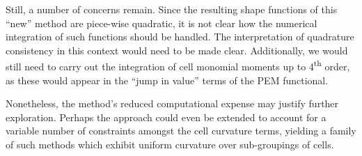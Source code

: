 \documentclass[11pt]{article} %
\begin{document}
Still, a number of concerns remain. Since the resulting shape functions of this ``new'' method are piece-wise quadratic, it is not clear how the numerical integration of such functions should be handled. The interpretation of quadrature consistency in this context would need to be made clear. Additionally, we would still need to carry out the integration of cell monomial moments up to 4\textsuperscript{th} order, as these would appear in the ``jump in value'' terms of the PEM functional.

Nonetheless, the method's reduced computational expense may justify further exploration. Perhaps the approach could even be extended to account for a variable number of constraints amongst the cell curvature terms, yielding a family of such methods which exhibit uniform curvature over sub-groupings of cells.
\end{document}

